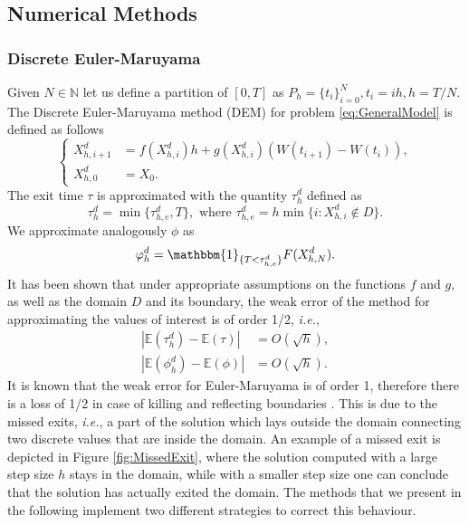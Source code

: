 \subsection{Numerical Methods}
 
\subsubsection{Discrete Euler-Maruyama}
Given $N \in \mathbb{N}$ let us define a partition of $[0,T]$ as $P_h = \{t_i\}_{i=0}^{N}, t_i = ih, h = T/N$. The Discrete Euler-Maruyama method (DEM) for problem \eqref{eq:GeneralModel} is defined as follows
\begin{equation}\label{eq:DEM}
	\left \{
	\begin{aligned}
		X_{h,i+1}^d &= f(X_{h,i}^d)h + g(X_{h,i}^d)(W(t_{i+1}) - W(t_{i})),  \\
		X_{h,0}^d &= X_0.
	\end{aligned} \right .
\end{equation} 
The exit time $\tau$ is approximated with the quantity $\tau_h^d$ defined as 
\begin{equation}\label{eq:TauDEM}
	\tau_h^d = \min\{\tau_{h,e}^d,T\}, \text{ where } \tau_{h,e}^d = h\min \{i \colon X_{h,i}^d \notin D\}.
\end{equation}
We approximate analogously $\phi$ as
\begin{equation}\label{eq:PhiDEM}
	 \phi_h^d = \mathbbm{1}_{\{T < \tau_{h,e}^d\}}F(X_{h,N}^d).
\end{equation}
It has been shown \cite{Gobet2000, Gobet2010, Higham2013} that under appropriate assumptions on the functions $f$ and $g$, as well as the domain $D$ and its boundary, the weak error of the method for approximating the values of interest is of order 1/2, \textit{i.e.},
\begin{align}\label{eq:ConvDEMTau}
	|\mathbb{E}(\tau_h^d) - \mathbb{E}(\tau)| &= O(\sqrt{h}), \\
	|\mathbb{E}(\phi_h^d) - \mathbb{E}(\phi)| &= O(\sqrt{h}).
\end{align}	
It is known that the weak error for Euler-Maruyama is of order 1, therefore there is a loss of 1/2 in case of killing and reflecting boundaries \cite[Chapter 14]{Kloeden1992}. This is due to the missed exits, \textit{i.e.}, a part of the solution which lays outside the domain connecting two discrete values that are inside the domain. An example of a missed exit is depicted in Figure \ref{fig:MissedExit}, where the solution computed with a large step size $h$ stays in the domain, while with a smaller step size one can conclude that the solution has actually exited the domain. The methods that we present in the following implement two different strategies to correct this behaviour.

